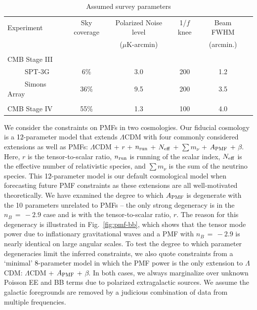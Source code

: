\documentclass[apj]{emulateapj}
\newcommand{\apmf}{\ensuremath{A_{\rm PMF}}}
\newcommand{\lcdm}{\ensuremath{\Lambda}CDM}
\newcommand{\nrun}{\ensuremath{n_{\rm run}}}
\newcommand{\neff}{\ensuremath{N_{\rm eff}}}
\newcommand{\mnu}{\ensuremath{\sum m_\nu}}
\newcommand{\changed}[1]{\textcolor{Black}{#1}}
\begin{document}
\begin{table}[tbh]
\begin{center}
\caption{\label{tab:experiments} Assumed survey parameters}
\small
\begin{tabular}{l || c c c c c }
Experiment & Sky coverage & Polarized Noise level  & 1/$f$ knee & Beam FWHM \\
& &($\mu$K-arcmin)&&(arcmin.)\\
\hline
\tiny \\ \small
CMB Stage III & & & & \\
~~~~~SPT-3G & 6\% & 3.0 & 200 & 1.2 \\
~~~~~Simons Array & 36\% & 9.5 & 200 & 3.5 \\ 
\tiny \\ \small
CMB Stage IV & 55\% & 1.3 & 100 & 4.0 \\
\end{tabular}
 \normalsize
\end{center}
\end{table}





We consider the constraints on PMFs in two cosmologies. 
Our fiducial cosmology is a \changed{12}-parameter model that extends \lcdm{} with  four  commonly considered extensions as well as PMFs:  \lcdm{} +  $r$ + \nrun{} +  \neff{} + \mnu{} + \apmf{} \changed{ + $\beta$}. 
Here, $r$ is the tensor-to-scalar ratio, \nrun{} is running of the scalar index, \neff{} is the effective number of relativistic species, and \mnu{} is the sum of the neutrino species. 
This \changed{12}-parameter model is our default cosmological model when forecasting future PMF constraints as these extensions are all well-motivated theoretically. 
We have examined the degree to which \apmf{} is degenerate with the 10 parameters unrelated to PMFs -- the only strong degeneracy is in the $n_B\,=\,-2.9$ case and is with the tensor-to-scalar ratio, $r$. 
The reason for this degeneracy is illustrated in Fig.~\ref{fig:pmf-bb}, which shows that the tensor mode power due to inflationary gravitational waves and a PMF with $n_B\,=\,-2.9$ is nearly identical on large angular scales. 
To test the degree to which parameter degeneracies limit the inferred constraints,  we also quote constraints from a `minimal' \changed{8}-parameter model in which the PMF power is the only extension to \lcdm{}:  \lcdm{} + \apmf{} \changed{ + $\beta$}.
In both cases, we always marginalize over unknown Poisson EE and BB  terms due to polarized extragalactic sources. 
We assume the galactic foregrounds are removed by a judicious combination of data from multiple frequencies. 
\end{document}
